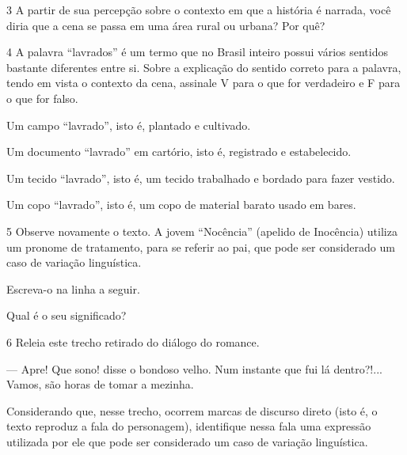 \num{3} A partir de sua percepção sobre o contexto em que a história é
narrada, você diria que a cena se passa em uma área rural ou urbana? Por
quê?



\num{4} A palavra “lavrados” é um termo que no Brasil inteiro possui
vários sentidos bastante diferentes entre si. Sobre a explicação do sentido correto
para a palavra, tendo em vista o contexto da cena, assinale V para o que for verdadeiro e F para o que for falso.

\begin{boxlist}
 Um campo “lavrado”, isto é, plantado e cultivado.

 Um documento “lavrado” em cartório, isto é, registrado e estabelecido.

 Um tecido “lavrado”, isto é, um tecido trabalhado e bordado para fazer vestido.

 Um copo “lavrado”, isto é, um copo de material barato usado em bares.
\end{boxlist}

\num{5} Observe novamente o texto. A jovem “Nocência” (apelido de
Inocência) utiliza um pronome de tratamento, para se referir ao pai, que
pode ser considerado um caso de variação linguística.

\begin{escolha}
\item Escreva-o na linha a seguir.\\

\item Qual é o seu significado?\\
\end{escolha}

\num{6} Releia este trecho retirado do diálogo do romance.

\begin{myquote}
— Apre! Que sono! disse o bondoso velho. Num instante que fui lá
dentro?!... Vamos, são horas de tomar a mezinha.
\end{myquote}

Considerando que, nesse trecho, ocorrem marcas de discurso direto (isto é,
o texto reproduz a fala do personagem), identifique nessa fala uma
expressão utilizada por ele que pode ser considerado um caso de
variação linguística.

